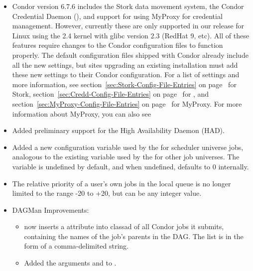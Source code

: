 \begin{itemize}
\item Condor version 6.7.6 includes the Stork data movement system, 
  the Condor Credential Daemon (), and support for using
  MyProxy for credential management.
  However, currently these are only supported in our release for Linux
  using the 2.4 kernel with glibc version 2.3 (RedHat 9, etc).
  All of these features require changes to the Condor configuration
  files to function properly.
  The default configuration files shipped with Condor already include
  all the new settings, but sites upgrading an existing installation
  must add these new settings to their Condor configuration.
  For a list of settings and more information, see
  section~\ref{sec:Stork-Config-File-Entries} on 
  page~\pageref{sec:Stork-Config-File-Entries} for Stork,
  section~\ref{sec:Credd-Config-File-Entries} on
  page~\pageref{sec:Credd-Config-File-Entries} for ,
  and section~\ref{sec:MyProxy-Config-File-Entries} on
  page~\pageref{sec:MyProxy-Config-File-Entries} for MyProxy.
  For more information about MyProxy, you can also see  

\item Added preliminary support for the High Availability Daemon (HAD).

\item Added a new 
configuration variable used by the  for scheduler
universe jobs, analogous to the existing
 variable used by the 
for other job universes.  The 
variable is undefined by default, and when undefined, defaults to 0
internally.

\item The relative priority of a user's own jobs in the local
 queue is no longer limited to the range -20 to +20,
but can be any integer value.

\item DAGMan Improvements:

\begin{itemize}

  \item {} now inserts a 
  attribute into classad of all Condor jobs it submits, containing the
  names of the job's parents in the DAG.  The list is in the form of a
  comma-delimited string.

  \item Added the  arguments  and
   to .


\end{itemize}
\end{itemize}
